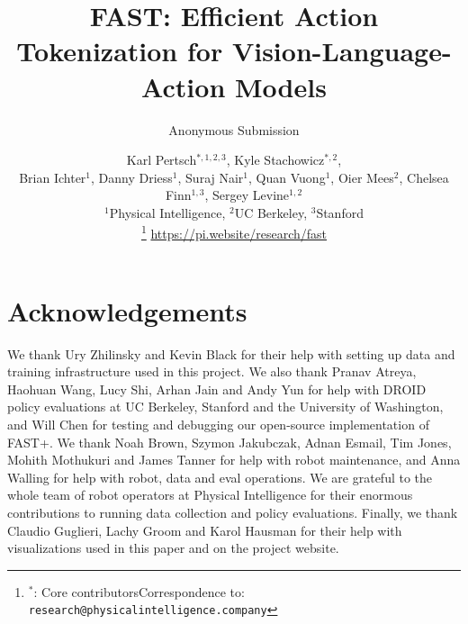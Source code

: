 \documentclass[conference]{IEEEtran}
\def \ModelAcronym {FAST}
\def \ModelUniversalAcronym {FAST+}
\begin{document}
\title{
\ModelAcronym: Efficient Action Tokenization for Vision-Language-Action Models
}



\def\cameraready{0}  %

\ifx\cameraready\undefined
    \author{
    Anonymous Submission
    }
\else
    \author{
    Karl Pertsch$^{\ast, 1, 2, 3}$, Kyle Stachowicz$^{\ast, 2}$,\\[0.1cm]
    Brian Ichter$^{1}$, Danny Driess$^{1}$, Suraj Nair$^{1}$, Quan Vuong$^{1}$, Oier Mees$^{2}$, Chelsea Finn$^{1, 3}$, Sergey Levine$^{1, 2}$\\[0.3cm]
    
    $^{1}$Physical Intelligence, $^{2}$UC Berkeley, $^{3}$Stanford\\[0.2cm]
    \thanks{$^\ast$: Core contributors\newline Correspondence to: \texttt{research@physicalintelligence.company}}
    \url{https://pi.website/research/fast}
    }
\fi




\maketitle


\IEEEpeerreviewmaketitle








\section*{Acknowledgements}

We thank Ury Zhilinsky and Kevin Black for their help with setting up data and training infrastructure used in this project. We also thank Pranav Atreya, Haohuan Wang, Lucy Shi, Arhan Jain and Andy Yun for help with DROID policy evaluations at UC Berkeley, Stanford and the University of Washington, and Will Chen for testing and debugging our open-source implementation of {\ModelUniversalAcronym}. We thank Noah Brown, Szymon Jakubczak, Adnan Esmail, Tim Jones, Mohith Mothukuri and James Tanner for help with robot maintenance, and Anna Walling for help with robot, data and eval operations. We are grateful to the whole team of robot operators at Physical Intelligence for their enormous contributions to running data collection and policy evaluations. Finally, we thank Claudio Guglieri, Lachy Groom and Karol Hausman for their help with visualizations used in this paper and on the project website.




\clearpage
\appendix


\end{document}
